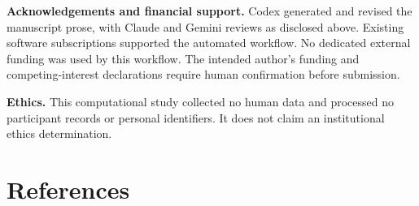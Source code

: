 \documentclass[
  british,
  11pt,
]{article}
\begin{document}
\textbf{Acknowledgements and financial support.} Codex generated and
revised the manuscript prose, with Claude and Gemini reviews as
disclosed above. Existing software subscriptions supported the automated
workflow. No dedicated external funding was used by this workflow. The
intended author's funding and competing-interest declarations require
human confirmation before submission.

\textbf{Ethics.} This computational study collected no human data and
processed no participant records or personal identifiers. It does not
claim an institutional ethics determination.

\section*{References}\label{references}
\end{document}
